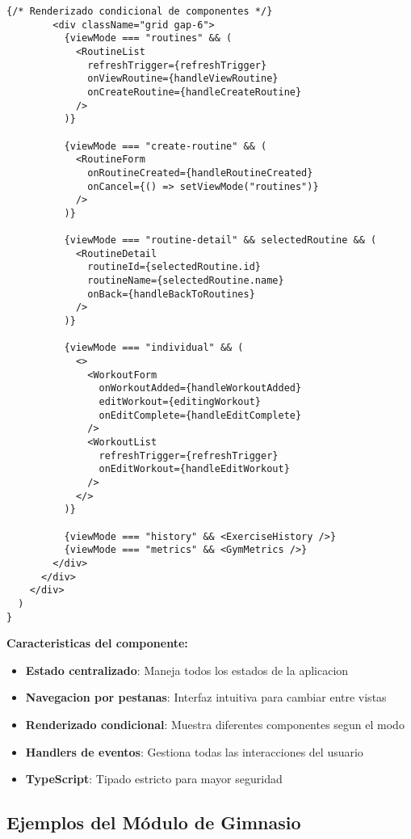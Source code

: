\documentclass[12pt,a4paper]{article}
\begin{document}
\begin{lstlisting}[caption=app/gym/page.tsx - Estructura completa]
        {/* Renderizado condicional de componentes */}
        <div className="grid gap-6">
          {viewMode === "routines" && (
            <RoutineList
              refreshTrigger={refreshTrigger}
              onViewRoutine={handleViewRoutine}
              onCreateRoutine={handleCreateRoutine}
            />
          )}

          {viewMode === "create-routine" && (
            <RoutineForm 
              onRoutineCreated={handleRoutineCreated} 
              onCancel={() => setViewMode("routines")} 
            />
          )}

          {viewMode === "routine-detail" && selectedRoutine && (
            <RoutineDetail
              routineId={selectedRoutine.id}
              routineName={selectedRoutine.name}
              onBack={handleBackToRoutines}
            />
          )}

          {viewMode === "individual" && (
            <>
              <WorkoutForm
                onWorkoutAdded={handleWorkoutAdded}
                editWorkout={editingWorkout}
                onEditComplete={handleEditComplete}
              />
              <WorkoutList 
                refreshTrigger={refreshTrigger} 
                onEditWorkout={handleEditWorkout} 
              />
            </>
          )}

          {viewMode === "history" && <ExerciseHistory />}
          {viewMode === "metrics" && <GymMetrics />}
        </div>
      </div>
    </div>
  )
}
\end{lstlisting}

\textbf{Caracteristicas del componente:}
\begin{itemize}
    \item \textbf{Estado centralizado}: Maneja todos los estados de la aplicacion
    \item \textbf{Navegacion por pestanas}: Interfaz intuitiva para cambiar entre vistas
    \item \textbf{Renderizado condicional}: Muestra diferentes componentes segun el modo
    \item \textbf{Handlers de eventos}: Gestiona todas las interacciones del usuario
    \item \textbf{TypeScript}: Tipado estricto para mayor seguridad
\end{itemize}

\subsection{Ejemplos del Módulo de Gimnasio}
\end{document}
